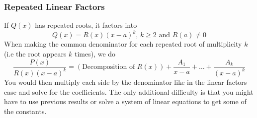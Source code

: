 \subsubsection{Repeated Linear Factors}

If $Q(x)$ has repeated roots, it factors into
\begin{equation*}
	Q(x) = R(x)(x-a)^k\text{, }k \geq 2\text{ and }R(a) \neq 0
\end{equation*}
When making the common denominator for each repeated root of multiplicity $k$ (i.e the root appears $k$ times), we do
\begin{equation*}
	\frac{P(x)}{R(x)(x-a)^k} = \left(\text{Decomposition of }R(x)\right) + \frac{A_1}{x-a}+\ldots+\frac{A_k}{(x-a)^k}
\end{equation*}
You would then multiply each side by the denominator like in the linear factors case and solve for the coefficients. The only additional difficulty is that you might have to use previous results or solve a system of linear equations to get some of the constants.

